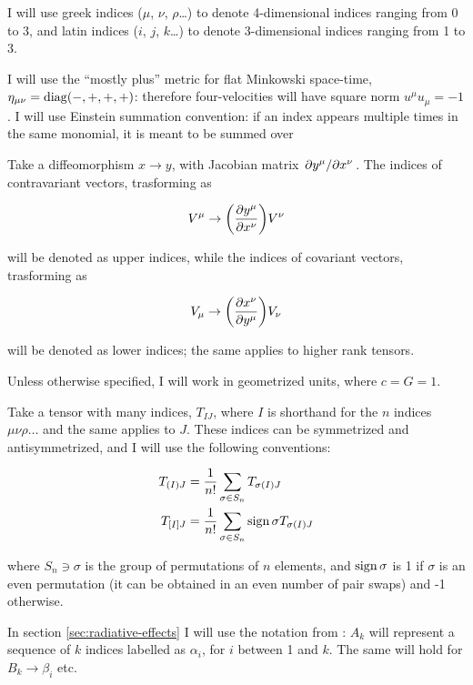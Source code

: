 \documentclass[main.tex]{subfiles}
\begin{document}
I will use greek indices ($\mu$, $\nu$, $\rho$\dots) to denote 4-dimensional indices ranging from 0 to 3, and latin indices ($i$, $j$, $k$\dots) to denote 3-dimensional indices ranging from 1 to 3.

I will use the ``mostly plus'' metric for flat Minkowski space-time, $\eta_{\mu \nu} = \operatorname{diag}(-, +, +, +)$: therefore four-velocities will have square norm \(u^\mu u_\mu = -1\).
I will use Einstein summation convention: if an index appears multiple times in the same monomial, it is meant to be summed over

Take a diffeomorphism $x \rightarrow y$, with Jacobian matrix $\pdv*{y^\mu}{x^\nu}$.
The indices of contravariant vectors, trasforming as

\begin{equation}
    V^\mu \rightarrow \qty( \pdv{y^\mu}{x^\nu})  V^\nu
\end{equation}

will be denoted as upper indices, while the indices of covariant vectors, trasforming as

\begin{equation}
V_\mu \rightarrow \qty( \pdv{x^\nu}{y^\mu})  V_\nu
\end{equation}

will be denoted as lower indices; the same applies to higher rank tensors.

Unless otherwise specified, I will work in geometrized units, where $c = G = 1$.

Take a tensor with many indices, $T_{IJ}$, where $I$ is shorthand for the $n$ indices $\mu \nu \rho \dots$ and the same applies to $J$. These indices can be symmetrized and antisymmetrized, and I will use the following conventions:

\begin{align}
    T_{(I)J} &= \frac{1}{n!} \sum_{\sigma \in S_n} T_{\sigma(I)J} \\
    T_{[I]J} &= \frac{1}{n!} \sum_{\sigma \in S_n} \sign{\sigma} T_{\sigma(I)J}
\end{align}

where $S_n \ni \sigma $ is the group of permutations of $n$ elements, and $\operatorname{sign}{\sigma}$ is 1 if $\sigma$ is an even permutation (it can be obtained in an even number of pair swaps) and -1 otherwise.

In section \ref{sec:radiative-effects} I will use the notation from \textcite[]{Thorne:1981feb}: \(A_k\) will represent a sequence of \(k\) indices labelled as \(\alpha_i\), for \(i\) between 1 and \(k\). The same will hold for \(B_k \rightarrow \beta_i\) etc.
\end{document}
